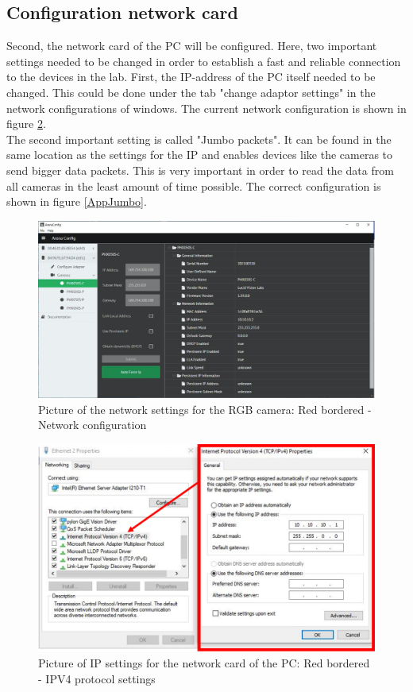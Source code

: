\subsection{Configuration network card}
Second, the network card of the PC will be configured. Here, two important settings needed to be changed in order to establish a fast and reliable connection to the devices in the lab. First, the IP-address of the PC itself needed to be changed. This could be done under the tab "change adaptor settings" in the network configurations of windows. The current network configuration is shown in figure \ref{AppIPpc}.\\
The second important setting is called "Jumbo packets". It can be found in the same location as the settings for the IP and enables devices like the cameras to send bigger data packets. This is very important in order to read the data from all cameras in the least amount of time possible. The correct configuration is shown in figure \ref{AppJumbo}.

\begin{figure}
\begin{center}
\includegraphics[width=12cm]{Pictures/AppIPcam}
\caption[Picture of the network settings for the RGB camera]{Picture of the network settings for the RGB camera: Red bordered - Network configuration}
\label{AppIPcam}
\end{center}
\end{figure}

\begin{figure}
\begin{center}
\includegraphics[width=12cm]{Pictures/AppIPpc}
\caption[Picture of IP settings for the network card of the PC]{Picture of IP settings for the network card of the PC: Red bordered - IPV4 protocol settings}
\label{AppIPpc}
\end{center}
\end{figure}

